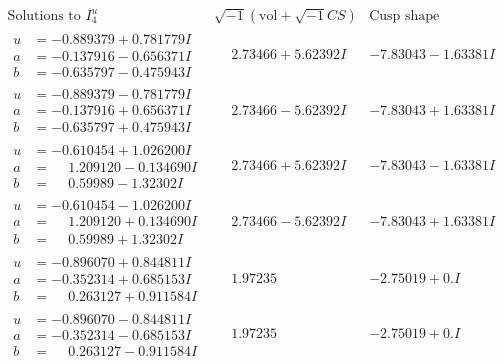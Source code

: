 \documentclass[1p]{elsarticle_modified}
\theoremstyle{definition}
\newcommand{\I}{\sqrt{-1}}
\begin{document}
$$\begin{array}{c|c|c}  
\text{Solutions to }I^u_{4}& \I (\text{vol} + \sqrt{-1}CS) & \text{Cusp shape}\\
 \hline 
\begin{aligned}
u &= -0.889379 + 0.781779 I \\
a &= -0.137916 - 0.656371 I \\
b &= -0.635797 - 0.475943 I\end{aligned}
 & \phantom{-}2.73466 + 5.62392 I & -7.83043 - 1.63381 I \\ \hline\begin{aligned}
u &= -0.889379 - 0.781779 I \\
a &= -0.137916 + 0.656371 I \\
b &= -0.635797 + 0.475943 I\end{aligned}
 & \phantom{-}2.73466 - 5.62392 I & -7.83043 + 1.63381 I \\ \hline\begin{aligned}
u &= -0.610454 + 1.026200 I \\
a &= \phantom{-}1.209120 - 0.134690 I \\
b &= \phantom{-}0.59989 - 1.32302 I\end{aligned}
 & \phantom{-}2.73466 + 5.62392 I & -7.83043 - 1.63381 I \\ \hline\begin{aligned}
u &= -0.610454 - 1.026200 I \\
a &= \phantom{-}1.209120 + 0.134690 I \\
b &= \phantom{-}0.59989 + 1.32302 I\end{aligned}
 & \phantom{-}2.73466 - 5.62392 I & -7.83043 + 1.63381 I \\ \hline\begin{aligned}
u &= -0.896070 + 0.844811 I \\
a &= -0.352314 + 0.685153 I \\
b &= \phantom{-}0.263127 + 0.911584 I\end{aligned}
 & \phantom{-}1.97235\phantom{ +0.000000I} & -2.75019 + 0. I\phantom{ +0.000000I} \\ \hline\begin{aligned}
u &= -0.896070 - 0.844811 I \\
a &= -0.352314 - 0.685153 I \\
b &= \phantom{-}0.263127 - 0.911584 I\end{aligned}
 & \phantom{-}1.97235\phantom{ +0.000000I} & -2.75019 + 0. I\phantom{ +0.000000I} \\ \hline\begin{aligned}

\end{aligned}
\end{array}$$
\end{document}
